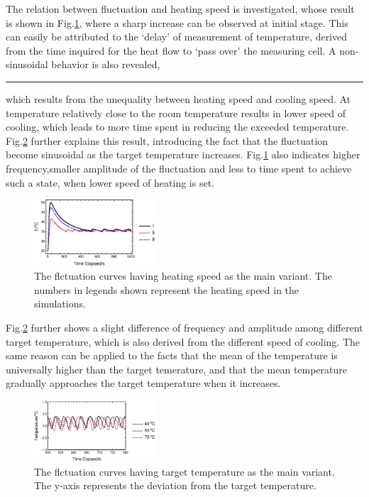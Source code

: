 \documentclass[%
 reprint,
 amsmath,amssymb,
 aps,
]{revtex4-1}
\begin{document}
The relation between fluctuation and heating speed is investigated, whose result is shown in Fig.\ref{heatspeed}, where a sharp increase can be observed at initial stage. This can easily be attributed to the `delay' of measurement of temperature, derived from the time inquired for the heat flow to `pass over' the measuring cell. A non-sinusoidal behavior is also revealed,
\begin{center}
\rule{8cm}{0.8pt}
\end{center}
 which results from the unequality between heating speed and cooling speed. At temperature relatively close to the room temperature results in lower speed of cooling, which leads to more time spent in reducing the exceeded temperature. Fig.\ref{targettemp} further explains this result, introducing the fact that the fluctuation become sinusoidal as the target temperature increases. Fig.\ref{heatspeed} also indicates higher frequency,smaller amplitude of the fluctuation and less to time spent to achieve such a state, when lower speed of heating is set.

\begin{figure}
\centering
\includegraphics[width=0.4\textwidth]{figures/heatspeed.eps}
\caption{The flctuation curves having heating speed as the main variant. The numbers in legends shown represent the heating speed in the simulations.}
\label{heatspeed}
\end{figure}

Fig.\ref{targettemp} further shows a slight difference of frequency and amplitude among different target temperature, which is also derived from the different speed of cooling. The same reason can be applied to the facts that the mean of the temperature is universally higher than the target temerature, and that the mean temperature gradually approaches the target temperature when it increases.

\begin{figure}
\centering
\includegraphics[width=0.4\textwidth]{figures/targettemp.eps}
\caption{The flctuation curves having target temperature as the main variant. The y-axis represents the deviation from the target temperature.}
\label{targettemp}
\end{figure}
\end{document}
